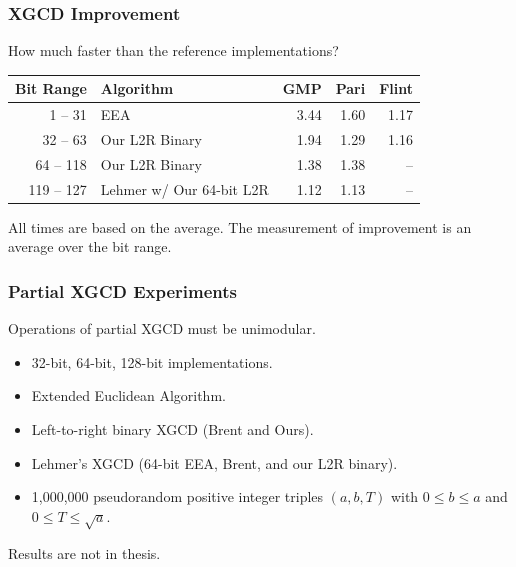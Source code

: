 \documentclass{beamer}
\newcommand{\smallfont}{\fontsize{6pt}{7.2}\selectfont}
\begin{document}
\begin{frame}
\frametitle{XGCD Improvement}

How much faster than the reference implementations?
\begin{table}
\centering
\begin{tabular}{ | r | l | r | r | r | }
\hline
Bit Range & Algorithm & GMP & Pari & Flint \\
\hline
1 -- 31 & EEA & 3.44 & 1.60 & 1.17 \\
32 -- 63 & Our L2R Binary & 1.94 & 1.29 & 1.16 \\
64 -- 118 & Our L2R Binary & 1.38 & 1.38 & -- \\
119 -- 127 & Lehmer w/ Our 64-bit L2R & 1.12 & 1.13 & -- \\
\hline
\end{tabular}
\end{table}

\bigskip
\smallfont
All times are based on the average.  The measurement of improvement is an average over the bit range.
\end{frame}


\begin{frame}
\frametitle{Partial XGCD Experiments}
Operations of partial XGCD must be unimodular.
\begin{itemize}
\item 32-bit, 64-bit, 128-bit implementations.
\item Extended Euclidean Algorithm.
\item Left-to-right binary XGCD (Brent and Ours).
\item Lehmer's XGCD (64-bit EEA, Brent, and our L2R binary).
\item 1,000,000 pseudorandom positive integer triples $(a, b, T)$ with $0 \le b \le a$ and $0 \le T \le \sqrt a$.
\end{itemize}

\bigskip
\smallfont
Results are not in thesis.
\end{frame}
\end{document}
